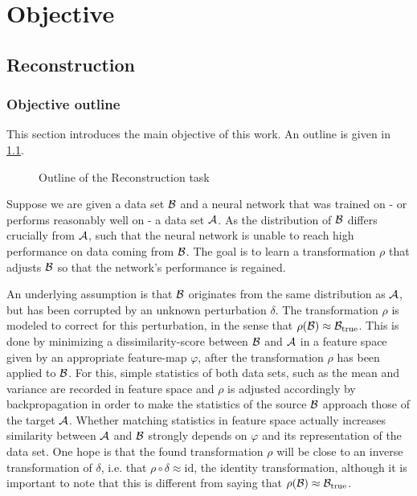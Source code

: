 \chapter{Objective}
\label{chap:Objective}





\section{Reconstruction}
\label{sec:Reconstruction}

\subsection{Objective outline}
This section introduces the main objective of this work. An outline is given in \cref{fig:outline}.
\begin{figure}[h]
    \centering
    
    \caption{Outline of the Reconstruction task}
    \label{fig:outline}
    \centering
\end{figure}


Suppose we are given a data set $\mathcal B$ 
and a neural network that was trained on - or performs reasonably well on - a data set $\mathcal A$.
As the distribution of $\mathcal B$ differs crucially from $\mathcal A$, 
such that the neural network is unable to reach high performance on data coming from $\mathcal B$.
The goal is to learn a transformation $\rho$ that adjusts $\mathcal B$ 
so that the network's performance is regained.

An underlying assumption is that $\mathcal B$ originates from the same distribution
as $\mathcal A$, but has been corrupted by an unknown perturbation $\delta$.
The transformation $\rho$ is modeled to correct for this perturbation, 
in the sense that $\rho(\mathcal B) \approx \mathcal B_\text{true}$.
This is done by minimizing a dissimilarity-score between $\mathcal B$ and $\mathcal A$ 
in a feature space given by an appropriate feature-map $\varphi$, 
after the transformation $\rho$ has been applied to $\mathcal B$.
For this, simple statistics of both data sets, such as the mean and variance 
are recorded in feature space and $\rho$ is adjusted accordingly by backpropagation 
in order to make the statistics of the source $\mathcal B$ approach those of the target $\mathcal A$.
%
Whether matching statistics in feature space actually increases similarity between $\mathcal A$ and $\mathcal B$
strongly depends on $\varphi$ and its representation of the data set.
%
One hope is that the found transformation $\rho$ will be close to an inverse transformation
of $\delta$, i.e. that $\rho\circ\delta \approx \text{id}$, the identity transformation,
although it is important to note that this is different from saying that $\rho(\mathcal B) \approx \mathcal B_\text{true}$.


